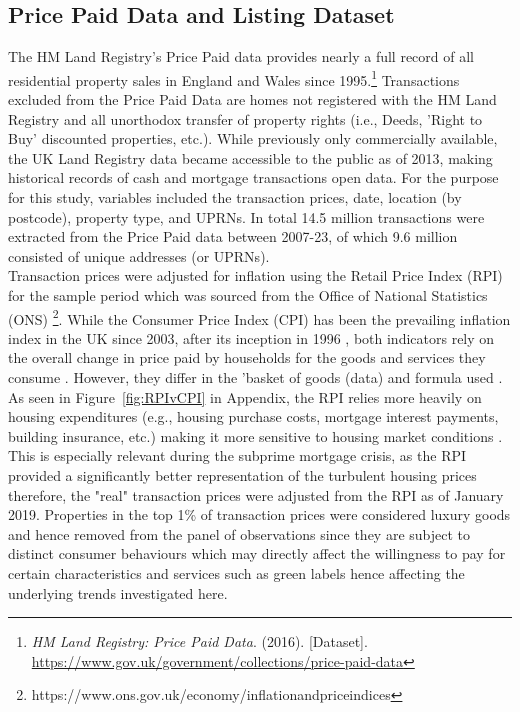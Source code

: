 \subsection{Price Paid Data and Listing Dataset} 
The HM Land Registry's Price Paid data provides nearly a full record of all residential property sales in England and Wales since 1995.\footnote{\textit{HM Land Registry: Price Paid Data}. (2016). [Dataset]. \href{https://www.gov.uk/government/collections/price-paid-data}{https://www.gov.uk/government/collections/price-paid-data}} Transactions excluded from the Price Paid Data are homes not registered with the HM Land Registry and all unorthodox transfer of property rights (i.e., Deeds, 'Right to Buy' discounted properties, etc.). While previously only commercially available, the UK Land Registry data became accessible to the public as of 2013, making historical records of cash and mortgage transactions open data. For the purpose for this study, variables included the transaction prices, date, location (by postcode), property type, and UPRNs. In total 14.5 million transactions were extracted from the Price Paid data between 2007-23, of which 9.6 million consisted of unique addresses (or UPRNs). \\



Transaction prices were adjusted for inflation using the Retail Price Index (RPI) for the sample period which was sourced from the Office of National Statistics (ONS) \footnote{https://www.ons.gov.uk/economy/inflationandpriceindices}. While the Consumer Price Index (CPI) has been the prevailing inflation index in the UK since 2003, after its inception in 1996 \cite{office_for_national_statistics_ons_consumer_2023},  both indicators rely on the overall change in price paid by households for the goods and services they consume \cite{jonhson_uk_2015}. However, they differ in the 'basket of goods (data) and formula used \cite{levell_comparing_2012}. As seen in Figure~\ref{fig:RPIvCPI} in Appendix, the RPI relies more heavily on housing expenditures (e.g., housing purchase costs, mortgage interest payments, building insurance, etc.) making it more sensitive to housing market conditions \cite{levell_comparing_2012}. This is especially relevant during the subprime mortgage crisis, as the RPI provided a significantly better representation of the turbulent housing prices therefore, the "real" transaction prices were adjusted from the RPI as of January 2019. Properties in the top 1\% of transaction prices were considered luxury goods and hence removed from the panel of observations since they are subject to distinct consumer behaviours \cite{allsopp_additional_2005} which may directly affect the willingness to pay for certain characteristics and services such as green labels \cite{fuerst_green_2016, hui_housing_2021, fuerst_energy_2016} hence affecting the underlying trends investigated here.  \\



